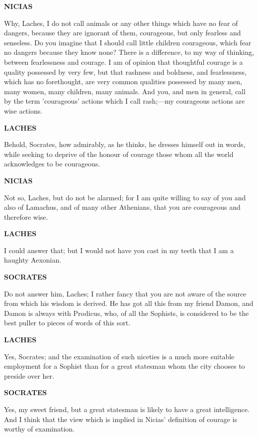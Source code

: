 \documentclass[11pt,letter]{book}
\begin{document}
\par \textbf{NICIAS}
\par   Why, Laches, I do not call animals or any other things which have no fear of dangers, because they are ignorant of them, courageous, but only fearless and senseless. Do you imagine that I should call little children courageous, which fear no dangers because they know none? There is a difference, to my way of thinking, between fearlessness and courage. I am of opinion that thoughtful courage is a quality possessed by very few, but that rashness and boldness, and fearlessness, which has no forethought, are very common qualities possessed by many men, many women, many children, many animals. And you, and men in general, call by the term 'courageous' actions which I call rash;—my courageous actions are wise actions.

\par \textbf{LACHES}
\par   Behold, Socrates, how admirably, as he thinks, he dresses himself out in words, while seeking to deprive of the honour of courage those whom all the world acknowledges to be courageous.

\par \textbf{NICIAS}
\par   Not so, Laches, but do not be alarmed; for I am quite willing to say of you and also of Lamachus, and of many other Athenians, that you are courageous and therefore wise.

\par \textbf{LACHES}
\par   I could answer that; but I would not have you cast in my teeth that I am a haughty Aexonian.

\par \textbf{SOCRATES}
\par   Do not answer him, Laches; I rather fancy that you are not aware of the source from which his wisdom is derived. He has got all this from my friend Damon, and Damon is always with Prodicus, who, of all the Sophists, is considered to be the best puller to pieces of words of this sort.

\par \textbf{LACHES}
\par   Yes, Socrates; and the examination of such niceties is a much more suitable employment for a Sophist than for a great statesman whom the city chooses to preside over her.

\par \textbf{SOCRATES}
\par   Yes, my sweet friend, but a great statesman is likely to have a great intelligence. And I think that the view which is implied in Nicias' definition of courage is worthy of examination.
\end{document}
